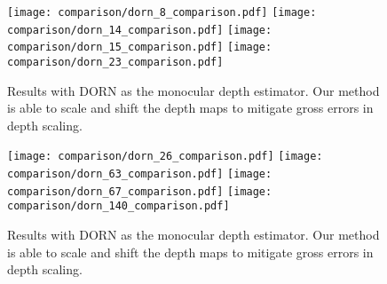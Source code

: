 \begin{figure}[H]
  \texttt{[image: comparison/dorn\_8\_comparison.pdf]}
  \texttt{[image: comparison/dorn\_14\_comparison.pdf]}
  \texttt{[image: comparison/dorn\_15\_comparison.pdf]}
  \texttt{[image: comparison/dorn\_23\_comparison.pdf]}
  \caption{Results with DORN as the monocular depth estimator. Our method is able to scale and shift
    the depth maps to mitigate gross errors in depth scaling.}
  \label{fig:dorn_1}
\end{figure}
\begin{figure}[H]
  \texttt{[image: comparison/dorn\_26\_comparison.pdf]}
  \texttt{[image: comparison/dorn\_63\_comparison.pdf]}
  \texttt{[image: comparison/dorn\_67\_comparison.pdf]}
  \texttt{[image: comparison/dorn\_140\_comparison.pdf]}
  \caption{Results with DORN as the monocular depth estimator. Our method is able to scale and shift
    the depth maps to mitigate gross errors in depth scaling.}
  \label{fig:dorn_2}
\end{figure}
